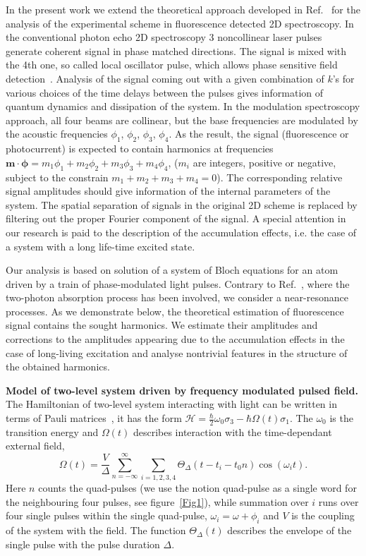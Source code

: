 \documentclass[prb,twocolumn,showpacs,epsfig,epsf]{revtex4}
\newcommand{\1}{\mathds{1}}
\begin{document}
In the present work we extend the theoretical approach developed in Ref.~\cite{our} for the analysis of the experimental scheme in fluorescence detected 2D spectroscopy. In the conventional photon echo 2D spectroscopy 3 noncollinear laser pulses generate coherent signal in phase matched directions. The signal is mixed with the 4th one, so called local oscillator pulse, which allows phase sensitive field detection~\cite{J2003, HZ2011}. Analysis of the signal coming out with a given combination of $k$'s for various choices of the time delays between the pulses gives information of quantum dynamics and dissipation of the system. In the modulation spectroscopy approach, all four beams are collinear, but the base frequencies are modulated by the acoustic frequencies $\phi_1$, $\phi_2$, $\phi_3$, $\phi_4$. As the result, the signal (fluorescence or photocurrent) is expected to contain harmonics at frequencies ${\boldsymbol m}\cdot{\boldsymbol \phi}=m_1\phi_1+m_2\phi_2+m_3\phi_3+m_4\phi_4$, ($m_i$ are integers, positive or negative, subject to the constrain $m_1+m_2+m_3+m_4=0$). The corresponding relative signal amplitudes should give information of the internal parameters of the system. The spatial separation of signals in the original 2D scheme is replaced by filtering out the proper Fourier component of the signal.  A special attention in our research is paid to the description of the accumulation effects, i.e. the case of a system with a long life-time excited state. 

Our analysis is based on solution of a system of Bloch equations for an atom driven by a train of phase-modulated light pulses. Contrary to Ref.~\cite{our}, where the two-photon absorption process has been involved, we consider a near-resonance processes. As we demonstrate below, the theoretical estimation of fluorescence signal contains the sought harmonics. We estimate their amplitudes and corrections to the amplitudes appearing due to the accumulation effects in the case of long-living excitation and analyse nontrivial features in the structure of the obtained harmonics.   

{\bf Model of two-level system driven by frequency modulated pulsed field.} The Hamiltonian of two-level system interacting with light can be written in terms of Pauli matrices~\cite{Pauli}, it has the form $\mathcal{H}=\frac{\hbar}{2}\omega_0\sigma_3-\hbar\Omega(t)\sigma_1$. The $\omega_0$ is the transition energy and $\Omega(t)$ describes interaction with the time-dependant external field, 
\begin{equation}\label{Om}
\Omega(t)=\frac{V}{\Delta}\sum_{n=-\infty}^\infty\sum_{i=1,2,3,4}\Theta_\Delta(t-t_i-t_0 n)\cos (\omega_i t).
\end{equation}
Here $n$ counts the quad-pulses (we use the notion quad-pulse as a single word for the neighbouring four pulses, see figure~\ref{Fig1}), while summation over $i$ runs over four single pulses within the single quad-pulse, $\omega_i=\omega+\phi_i$ and $V$ is the coupling of the system with the field. The function $\Theta_\Delta(t)$ describes the envelope of the single pulse with the pulse duration $\Delta$.
\end{document}
